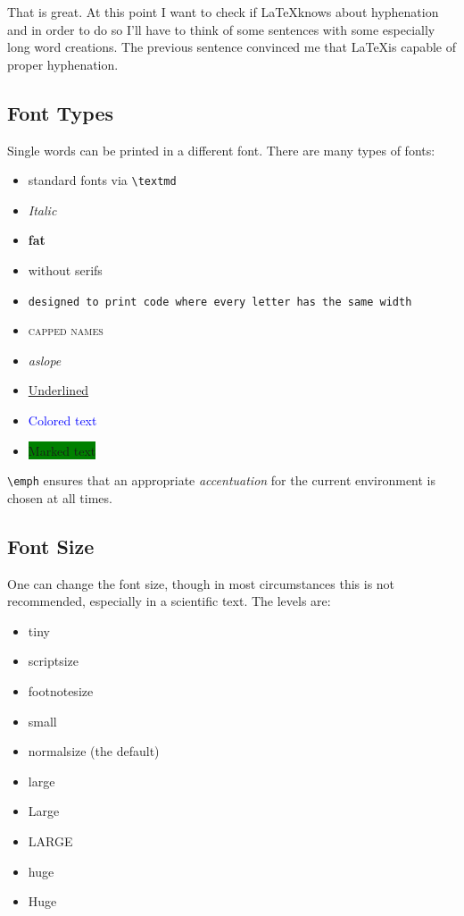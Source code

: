 \documentclass[a4paper]{scrartcl}
\begin{document}
	That is great. At this point I want to check if \LaTeX knows about hyphenation and in order to do so I'll have to think of some sentences with some especially long word creations. The previous sentence convinced me that \LaTeX is capable of proper hyphenation.
	
	\subsection{Font Types}
	Single words can be printed in a different font. There are many types of fonts:
	\begin{itemize}
		\item \textmd{standard fonts via} \texttt{\textbackslash textmd}
		\item \textit{Italic} 
		\item \textbf{fat}
		\item \textsf{without serifs}
		\item \texttt{designed to print code where every letter has the same width}
		\item \textsc{capped names}
		\item \textsl{aslope}
		\item \underline{Underlined}
		\item \textcolor{blue}{Colored text} 
		\item \colorbox{green}{Marked text}
	\end{itemize}

\texttt{\textbackslash emph} ensures that an appropriate \emph{accentuation} for the current environment is chosen at all times.

	\subsection{Font Size}
One can change the font size, though in most circumstances this is not recommended, especially in a scientific text. The levels are:

\begin{itemize}
	\item {\tiny tiny}
	\item {\scriptsize scriptsize}
	\item {\footnotesize footnotesize}
	\item {\small small}
	\item {\normalsize normalsize (the default)}
	\item {\large large}
	\item {\Large Large}
	\item {\LARGE LARGE}
	\item {\huge huge}
	\item {\Huge Huge}
\end{itemize}
\end{document}
